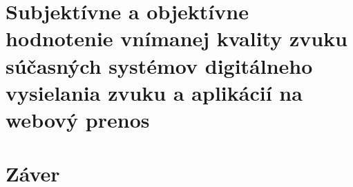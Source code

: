\documentclass[10pt,twoside,slovak,a4paper]{article}
\begin{document}
\section{Subjektívne a objektívne hodnotenie vnímanej kvality zvuku súčasných systémov digitálneho vysielania zvuku a aplikácií na webový prenos } \label{hodnotenie}




\section{Záver} \label{zaver} %





%
\end{document}
